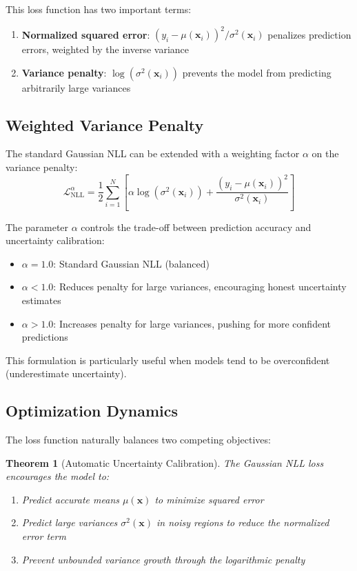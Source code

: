 \documentclass[11pt,a4paper]{article}
\newtheorem{theorem}{Theorem}
\begin{document}
This loss function has two important terms:
\begin{enumerate}
    \item \textbf{Normalized squared error}: $(y_i - \mu(\mathbf{x}_i))^2 / \sigma^2(\mathbf{x}_i)$ penalizes prediction errors, weighted by the inverse variance
    \item \textbf{Variance penalty}: $\log(\sigma^2(\mathbf{x}_i))$ prevents the model from predicting arbitrarily large variances
\end{enumerate}

\subsection{Weighted Variance Penalty}

The standard Gaussian NLL can be extended with a weighting factor $\alpha$ on the variance penalty:
\begin{equation}
\boxed{\mathcal{L}_{\text{NLL}}^{\alpha} = \frac{1}{2}\sum_{i=1}^N \left[ \alpha\log(\sigma^2(\mathbf{x}_i)) + \frac{(y_i - \mu(\mathbf{x}_i))^2}{\sigma^2(\mathbf{x}_i)} \right]}
\end{equation}

The parameter $\alpha$ controls the trade-off between prediction accuracy and uncertainty calibration:
\begin{itemize}
    \item $\alpha = 1.0$: Standard Gaussian NLL (balanced)
    \item $\alpha < 1.0$: Reduces penalty for large variances, encouraging honest uncertainty estimates
    \item $\alpha > 1.0$: Increases penalty for large variances, pushing for more confident predictions
\end{itemize}

This formulation is particularly useful when models tend to be overconfident (underestimate uncertainty).

\subsection{Optimization Dynamics}

The loss function naturally balances two competing objectives:

\begin{theorem}[Automatic Uncertainty Calibration]
The Gaussian NLL loss encourages the model to:
\begin{enumerate}
    \item Predict accurate means $\mu(\mathbf{x})$ to minimize squared error
    \item Predict large variances $\sigma^2(\mathbf{x})$ in noisy regions to reduce the normalized error term
    \item Prevent unbounded variance growth through the logarithmic penalty
\end{enumerate}
\end{theorem}
\end{document}
